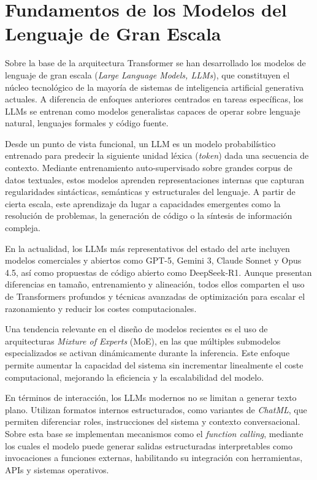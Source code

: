 \section{Fundamentos de los Modelos del Lenguaje de Gran Escala}

Sobre la base de la arquitectura Transformer se han desarrollado los modelos de lenguaje de gran escala (\textit{Large Language Models, LLMs}), que constituyen el núcleo tecnológico de la mayoría de sistemas de inteligencia artificial generativa actuales. A diferencia de enfoques anteriores centrados en tareas específicas, los LLMs se entrenan como modelos generalistas capaces de operar sobre lenguaje natural, lenguajes formales y código fuente.

Desde un punto de vista funcional, un LLM es un modelo probabilístico entrenado para predecir la siguiente unidad léxica (\textit{token}) dada una secuencia de contexto. Mediante entrenamiento auto-supervisado sobre grandes corpus de datos textuales, estos modelos aprenden representaciones internas que capturan regularidades sintácticas, semánticas y estructurales del lenguaje. \cite{wei2022emergent}
A partir de cierta escala, este aprendizaje da lugar a capacidades emergentes como la resolución de problemas, la generación de código o la síntesis de información compleja.

En la actualidad, los LLMs más representativos del estado del arte incluyen modelos comerciales y abiertos como GPT-5, Gemini 3, Claude Sonnet y Opus 4.5, así como propuestas de código abierto como DeepSeek-R1. \cite{openai2024gpt4, deepseek2025r1}
Aunque presentan diferencias en tamaño, entrenamiento y alineación, todos ellos comparten el uso de Transformers profundos y técnicas avanzadas de optimización para escalar el razonamiento y reducir los costes computacionales.

Una tendencia relevante en el diseño de modelos recientes es el uso de arquitecturas \textit{Mixture of Experts} (MoE), en las que múltiples submodelos especializados se activan dinámicamente durante la inferencia. \cite{shazeer2017moe}
Este enfoque permite aumentar la capacidad del sistema sin incrementar linealmente el coste computacional, mejorando la eficiencia y la escalabilidad del modelo.

En términos de interacción, los LLMs modernos no se limitan a generar texto plano. Utilizan formatos internos estructurados, como variantes de \textit{ChatML}, que permiten diferenciar roles, instrucciones del sistema y contexto conversacional. %
Sobre esta base se implementan mecanismos como el \textit{function calling}, mediante los cuales el modelo puede generar salidas estructuradas interpretables como invocaciones a funciones externas, habilitando su integración con herramientas, APIs y sistemas operativos. \cite{schick2023toolformer}

